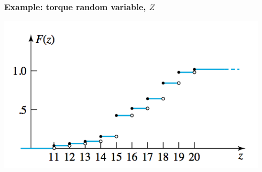 \documentclass[handout]{beamer}\usepackage{graphicx, color}
\numberwithin{equation}{section}
\begin{document}
\begin{frame}
\frametitle{Example: torque random variable, $Z$}
 \includegraphics{../../fig/torquez.png}
\end{frame}
\end{document}
